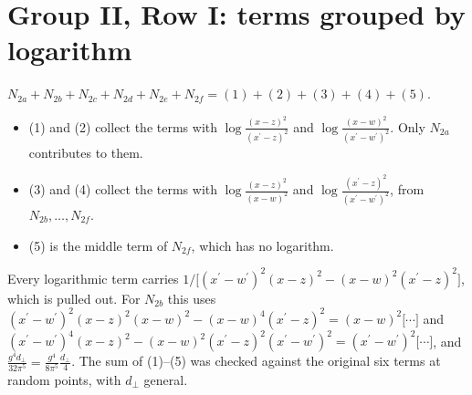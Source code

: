\documentclass[10pt]{article}
\begin{document}
\section*{Group II, Row I: terms grouped by logarithm}
\noindent $N_{2a}+N_{2b}+N_{2c}+N_{2d}+N_{2e}+N_{2f}=(1)+(2)+(3)+(4)+(5)$.
\begin{itemize}
\item (1) and (2) collect the terms with $\log\frac{(x-z)^{2}}{(x^{\prime}-z)^{2}}$ and $\log\frac{(x-w)^{2}}{(x^{\prime}-w^{\prime})^{2}}$. Only $N_{2a}$ contributes to them.
\item (3) and (4) collect the terms with $\log\frac{(x-z)^{2}}{(x-w)^{2}}$ and $\log\frac{(x^{\prime}-z)^{2}}{(x^{\prime}-w^{\prime})^{2}}$, from $N_{2b},\dots,N_{2f}$.
\item (5) is the middle term of $N_{2f}$, which has no logarithm.
\end{itemize}
Every logarithmic term carries $1/\big[(x^{\prime}-w^{\prime})^{2}(x-z)^{2}-(x-w)^{2}(x^{\prime}-z)^{2}\big]$, which is pulled out. For $N_{2b}$ this uses $(x^{\prime}-w^{\prime})^{2}(x-z)^{2}(x-w)^{2}-(x-w)^{4}(x^{\prime}-z)^{2}=(x-w)^{2}\big[\cdots\big]$ and $(x^{\prime}-w^{\prime})^{4}(x-z)^{2}-(x-w)^{2}(x^{\prime}-z)^{2}(x^{\prime}-w^{\prime})^{2}=(x^{\prime}-w^{\prime})^{2}\big[\cdots\big]$, and $\frac{g^{4}d_{\perp}}{32\pi^{5}}=\frac{g^{4}}{8\pi^{5}}\frac{d_{\perp}}{4}$. The sum of (1)--(5) was checked against the original six terms at random points, with $d_{\perp}$ general.
\end{document}
